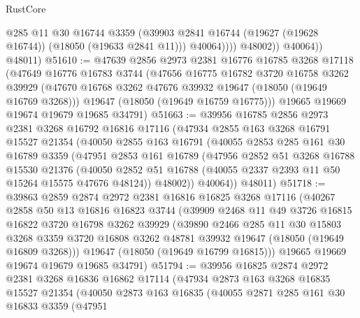 \begin{lexlean}{RustCore}
\begin{coremodule}
                      @285
                      @11
                      @30
                      @16744
                      @3359
                      (@39903 @2841 @16744 (@19627 (@19628 @16744)) (@18050 (@19633 @2841 @11)))
                      @40064))))
              @48002))
          @40064))
      @48011)
@51610 := @47639
    @2856
    @2973
    @2381
    @16776
    @16785
    @3268
    @17118
    (@47649
      @16776
      @16783
      @3744
      (@47656
        @16775
        @16782
        @3720
        @16758
        @3262
        @39929
        (@47670 @16768 @3262 @47676 @39932 @19647 (@18050 (@19649 @16769 @3268)))
        @19647
        (@18050 (@19649 @16759 @16775)))
      @19665
      @19669
      @19674
      @19679
      @19685
      @34791)
@51663 := @39956
    @16785
    @2856
    @2973
    @2381
    @3268
    @16792
    @16816
    @17116
    (@47934
      @2855
      @163
      @3268
      @16791
      @15527
      @21354
      (@40050
        @2855
        @163
        @16791
        (@40055
          @2853
          @285
          @161
          @30
          @16789
          @3359
          (@47951
            @2853
            @161
            @16789
            (@47956
              @2852
              @51
              @3268
              @16788
              @15530
              @21376
              (@40050 @2852 @51 @16788 (@40055 @2337 @2393 @11 @50 @15264 @15575 @47676 @48124))
              @48002))
          @40064))
      @48011)
@51718 := @39863
    @2859
    @2874
    @2972
    @2381
    @16816
    @16825
    @3268
    @17116
    (@40267
      @2858
      @50
      @13
      @16816
      @16823
      @3744
      (@39909
        @2468
        @11
        @49
        @3726
        @16815
        @16822
        @3720
        @16798
        @3262
        @39929
        (@39890
          @2466
          @285
          @11
          @30
          @15803
          @3268
          @3359
          @3720
          @16808
          @3262
          @48781
          @39932
          @19647
          (@18050 (@19649 @16809 @3268)))
        @19647
        (@18050 (@19649 @16799 @16815)))
      @19665
      @19669
      @19674
      @19679
      @19685
      @34791)
@51794 := @39956
    @16825
    @2874
    @2972
    @2381
    @3268
    @16836
    @16862
    @17114
    (@47934
      @2873
      @163
      @3268
      @16835
      @15527
      @21354
      (@40050
        @2873
        @163
        @16835
        (@40055
          @2871
          @285
          @161
          @30
          @16833
          @3359
          (@47951

\end{coremodule}
\end{lexlean}

